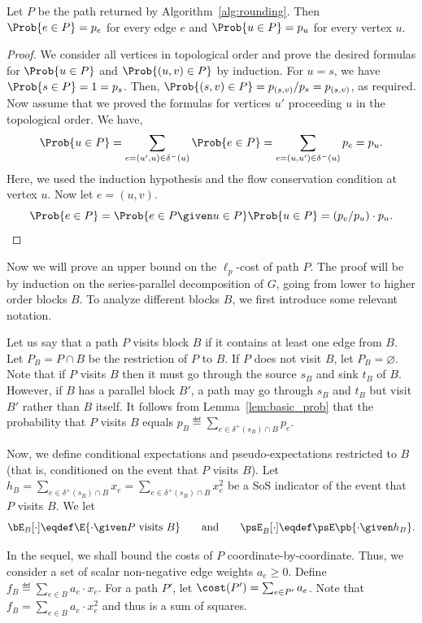 \documentclass[11pt,a4paper]{article}
\begin{document}
\begin{lemma}\label{lem:basic_prob}
Let $P$ be the path returned by Algorithm~\ref{alg:rounding}.
Then $\Prob{e\in P} = p_e$ for every edge $e$ and $\Prob{u\in P} = p_u$ for every vertex $u$.
\end{lemma}
\begin{proof}
We consider all vertices in topological order and prove the desired formulas for $\Prob{u \in P}$ and $\Prob{(u,v)\in P}$ by induction. For $u=s$, we have $\Prob{s\in P} = 1 = p_s$. Then, $\Prob{(s,v)\in P} = p_{(s,v)}/p_s = p_{(s,v)}$, as required.
Now assume that we proved the formulas for vertices $u'$ proceeding $u$ in the topological order. We have,
$$\Prob{u\in P} = \sum_{e=(u',u)\in \delta^-(u)} \Prob{e\in P} = \sum_{e=(u,u')\in \delta^-(u)} p_{e} = p_u.
$$
Here, we used the induction hypothesis and the flow conservation condition at vertex $u$. Now let $e=(u,v)$.
$$\Prob{e\in P} = \Prob{e \in P \given u\in P} \Prob{u \in P} = (p_e/p_u) \cdot p_u.
$$
\qedhere
\end{proof}

Now we will prove an upper bound on the $\ell_p$-cost of path $P$. The proof will be by induction on the series-parallel decomposition of $G$, going from lower to higher order blocks $B$. To analyze different blocks $B$, we first introduce some relevant notation.

Let us say that a path $P$ visits block $B$ if it contains at least one edge from $B$. 
Let $P_B = P\cap B$ be the restriction of $P$ to $B$. If $P$ does not visit $B$, let $P_B = \varnothing$.
Note that if $P$ visits $B$ then it must go through the source $s_B$ and sink $t_B$ of $B$. However, if \(B\) has a parallel block $B'$, a path may go through $s_B$ and $t_B$ but visit $B'$ rather than $B$ itself.
It follows from Lemma~\ref{lem:basic_prob} that the probability that $P$ visits $B$ equals $p_B \eqdef \sum_{e\in \delta^+(s_B) \cap B} p_e$.

Now, we define conditional expectations and pseudo-expectations restricted to $B$ (that is, conditioned on the event that \(P\) visits \(B\)). 
Let $h_B = \sum_{e \in \delta^+(s_B)\cap B} x_e = \sum_{e \in \delta^+(s_B)\cap B} x_e^2$ be a SoS indicator of the event that $P$ visits $B$. We let
\[\bE_B[\cdot] \eqdef \E{\cdot \given P \text{ visits } B} \qquad\text{and}\qquad\psE_B[\cdot] \eqdef \psE\pb{\cdot \given h_B}.\]

In the sequel, we shall bound the costs of \(P\) coordinate-by-coordinate. Thus, we consider a set of scalar non-negative edge weights \(a_e \ge 0\). Define 
$f_B \eqdef \sum_{e \in B} a_e \cdot x_e$. For a path $P'$, let $\cost(P') = \sum_{e\in P'}a_e$. Note that $f_B = \sum_{e\in B} a_e \cdot x_e^2$ and thus is a sum of squares.
\end{document}
